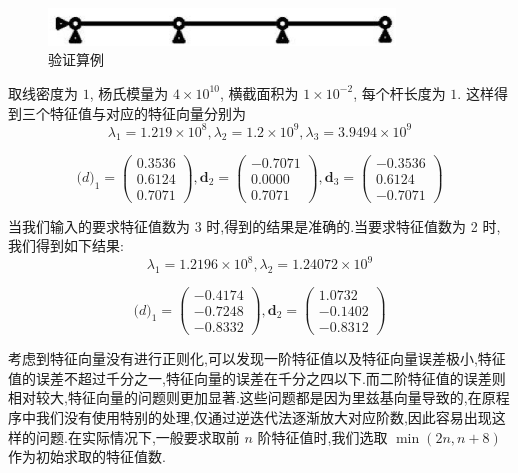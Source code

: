 \begin{figure}[htbp]
  \centering
  \includegraphics[height=1cm]{modalex}
  \caption{验证算例}
  \label{modalex1}
\end{figure}

取线密度为 $1$, 杨氏模量为 $4\times 10^{10}$, 横截面积为 $1\times 10^{-2}$, 每个杆长度为 $1$. 这样得到三个特征值与对应的特征向量分别为
\[
\lambda_1=1.219\times10^8,\lambda_2=1.2\times10^9,\lambda_3=3.9494\times10^9 \]

\[
\mathbf(d)_1=\left( \begin{array}{c} 0.3536 \\ 0.6124 \\ 0.7071 \end{array} \right),
\mathbf{d}_2=\left( \begin{array}{c} -0.7071 \\ 0.0000 \\ 0.7071 \end{array} \right),
\mathbf{d}_3=\left( \begin{array}{c} -0.3536 \\ 0.6124 \\ -0.7071 \end{array} \right) \]

当我们输入的要求特征值数为 3 时,得到的结果是准确的.当要求特征值数为 2 时,我们得到如下结果:
\[
\lambda_1=1.2196\times10^8,\lambda_2=1.24072\times10^9 \]

\[
\mathbf(d)_1=\left( \begin{array}{c} -0.4174 \\ -0.7248 \\ -0.8332 \end{array} \right),
\mathbf{d}_2=\left( \begin{array}{c} 1.0732 \\ -0.1402 \\ -0.8312 \end{array} \right) \]

考虑到特征向量没有进行正则化,可以发现一阶特征值以及特征向量误差极小,特征值的误差不超过千分之一,特征向量的误差在千分之四以下.而二阶特征值的误差则相对较大,特征向量的问题则更加显著.这些问题都是因为里兹基向量导致的,在原程序中我们没有使用特别的处理,仅通过逆迭代法逐渐放大对应阶数,因此容易出现这样的问题.在实际情况下,一般要求取前 $n$ 阶特征值时,我们选取 $\min (2n,n+8)$ 作为初始求取的特征值数.

